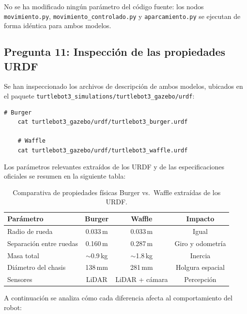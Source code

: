 No se ha modificado ningún parámetro del código fuente: los nodos \texttt{movimiento.py}, \texttt{movimiento\_controlado.py} y \texttt{aparcamiento.py} se ejecutan de forma idéntica para ambos modelos.

\subsection*{Pregunta 11: Inspección de las propiedades URDF}

Se han inspeccionado los archivos de descripción de ambos modelos, ubicados en el paquete \texttt{turtlebot3\_simulations/turtlebot3\_gazebo/urdf}:

\begin{lstlisting}[style=bash]
	# Burger
	cat turtlebot3_gazebo/urdf/turtlebot3_burger.urdf
	
	# Waffle
	cat turtlebot3_gazebo/urdf/turtlebot3_waffle.urdf
\end{lstlisting}

Los parámetros relevantes extraídos de los URDF y de las especificaciones oficiales se resumen en la siguiente tabla:

\begin{table}[H]
	\centering
	\begin{tabular}{lccc}
		\toprule
		\textbf{Parámetro}         & \textbf{Burger}  & \textbf{Waffle}  & \textbf{Impacto} \\
		\midrule
		Radio de rueda              & 0.033\,m         & 0.033\,m         & Igual \\
		Separación entre ruedas     & 0.160\,m         & 0.287\,m         & Giro y odometría \\
		Masa total                  & $\sim$0.9\,kg    & $\sim$1.8\,kg    & Inercia \\
		Diámetro del chasis         & 138\,mm          & 281\,mm          & Holgura espacial \\
		Sensores                    & LiDAR            & LiDAR + cámara   & Percepción \\
		\bottomrule
	\end{tabular}
	\caption{Comparativa de propiedades físicas Burger vs.\ Waffle extraídas de los URDF.}
	\label{tab:urdf_comparativa}
\end{table}

A continuación se analiza cómo cada diferencia afecta al comportamiento del robot:

